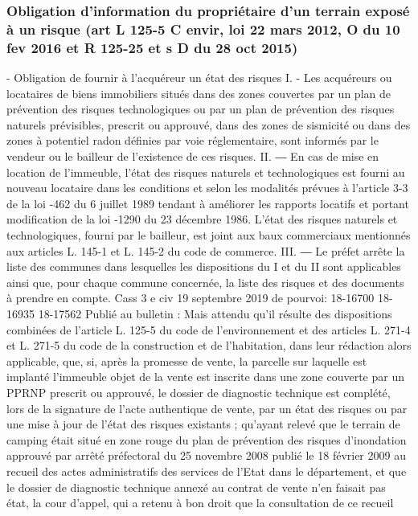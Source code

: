 \documentclass[11pt,a4paper]{report}
\begin{document}
	\subsubsection{Obligation d’information du propriétaire d’un terrain exposé à un risque (art L 125-5 C envir, loi
	22 mars 2012, O du 10 fev 2016 et R 125-25 et s D du 28 oct 2015)}
	- Obligation de fournir à l’acquéreur un état des risques
	I. - Les acquéreurs ou locataires de biens immobiliers situés dans des zones couvertes par un plan de prévention
	des risques technologiques ou par un plan de prévention des risques naturels prévisibles, prescrit ou approuvé,
	dans des zones de sismicité ou dans des zones à potentiel radon définies par voie réglementaire, sont informés
	par le vendeur ou le bailleur de l'existence de ces risques.
	II. ― En cas de mise en location de l'immeuble, l'état des risques naturels et technologiques est fourni au
	nouveau locataire dans les conditions et selon les modalités prévues à l'article 3-3 de la loi -462 du 6
	juillet 1989 tendant à améliorer les rapports locatifs et portant modification de la loi -1290 du 23
	décembre 1986.
	L'état des risques naturels et technologiques, fourni par le bailleur, est joint aux baux commerciaux mentionnés
	aux articles L. 145-1 et L. 145-2 du code de commerce.
	III. ― Le préfet arrête la liste des communes dans lesquelles les dispositions du I et du II sont applicables ainsi
	que, pour chaque commune concernée, la liste des risques et des documents à prendre en compte.
	Cass 3 e civ 19 septembre 2019 \No  de pourvoi: 18-16700 18-16935 18-17562 Publié au bulletin : Mais attendu
	qu'il résulte des dispositions combinées de l'article L. 125-5 du code de l'environnement et des articles L. 271-4
	et L. 271-5 du code de la construction et de l'habitation, dans leur rédaction alors applicable, que, si, après la
	promesse de vente, la parcelle sur laquelle est implanté l'immeuble objet de la vente est inscrite dans une zone
	couverte par un PPRNP prescrit ou approuvé, le dossier de diagnostic technique est complété, lors de la
	signature de l'acte authentique de vente, par un état des risques ou par une mise à jour de l'état des risques
	existants ; qu'ayant relevé que le terrain de camping était situé en zone rouge du plan de prévention des risques
	d'inondation approuvé par arrêté préfectoral du 25 novembre 2008 publié le 18 février 2009 au recueil des actes
	administratifs des services de l'Etat dans le département, et que le dossier de diagnostic technique annexé au
	contrat de vente n'en faisait pas état, la cour d'appel, qui a retenu à bon droit que la consultation de ce recueil
\end{document}
